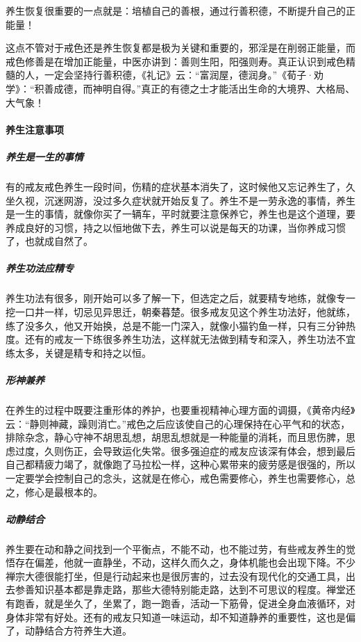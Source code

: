 养生恢复很重要的一点就是：培植自己的善根，通过行善积德，不断提升自己的正能量！

这点不管对于戒色还是养生恢复都是极为关键和重要的，邪淫是在削弱正能量，而戒色修善是在增加正能量，中医亦讲到：善则生阳，阳强则寿。真正认识到戒色精髓的人，一定会坚持行善积德，《礼记》云：“富润屋，德润身。”《荀子·劝学》：“积善成德，而神明自得。”真正的有德之士才能活出生命的大境界、大格局、大气象！

\paragraph{养生注意事项}

\subparagraph{养生是一生的事情}

有的戒友戒色养生一段时间，伤精的症状基本消失了，这时候他又忘记养生了，久坐久视，沉迷网游，没过多久症状就开始反复了。养生不是一劳永逸的事情，养生是一生的事情，就像你买了一辆车，平时就要注意保养它，养生也是这个道理，要养成良好的习惯，持之以恒地做下去，养生可以说是每天的功课，当你养成习惯了，也就成自然了。

\subparagraph{养生功法应精专}

养生功法有很多，刚开始可以多了解一下，但选定之后，就要精专地练，就像专一挖一口井一样，切忌见异思迁，朝秦暮楚。很多戒友见这个养生功法好，他就练，练了没多久，他又开始换，总是不能一门深入，就像小猫钓鱼一样，只有三分钟热度。还有的戒友一下练很多养生功法，这样就无法做到精专和深入，养生功法不宜练太多，关键是精专和持之以恒。

\subparagraph{形神兼养}

在养生的过程中既要注重形体的养护，也要重视精神心理方面的调摄，《黄帝内经》云：“静则神藏，躁则消亡。”戒色之后应该使自己的心理保持在心平气和的状态，排除杂念，静心守神不胡思乱想，胡思乱想就是一种能量的消耗，而且思伤脾，思虑过度，久则伤正，会导致运化失常。很多强迫症的戒友应该深有体会，想到最后自己都精疲力竭了，就像跑了马拉松一样，这种心累带来的疲劳感是很强的，所以一定要学会控制自己的念头，这就是在修心，戒色需要修心，养生也需要修心，总之，修心是最根本的。

\subparagraph{动静结合}

养生要在动和静之间找到一个平衡点，不能不动，也不能过劳，有些戒友养生的觉悟存在偏差，他就一直静坐，不动，这样久而久之，身体机能也会出现下降。不少禅宗大德很能打坐，但是行动起来也是很厉害的，过去没有现代化的交通工具，出去参善知识基本都是靠走路，那些大德特别能走路，达到不可思议的程度。禅堂还有跑香，就是坐久了，坐累了，跑一跑香，活动一下筋骨，促进全身血液循环，对身体非常有好处。还有的戒友只知道一味运动，却不知道静养的重要性，这也是偏了，动静结合方符养生大道。

